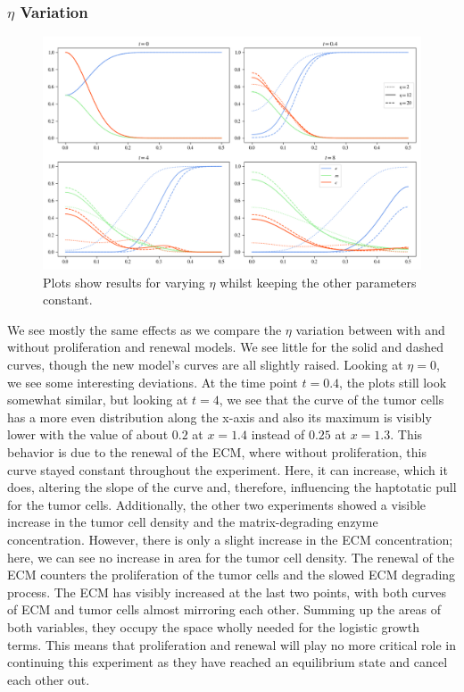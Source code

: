 \subsubsection*{$\eta$ Variation}
\begin{figure}[h]
    \centering
    \includegraphics[width=\textwidth]{resources/images/prolif_eta_variation.png}
    \caption{Plots show results for varying $\eta$ whilst keeping the other parameters constant.}
    \label{fig:prolif_eta_variation}
\end{figure}

We see mostly the same effects as we compare the $\eta$ variation between with and without proliferation and renewal models. We see little for the solid and dashed curves, though the new model's curves are all slightly raised. Looking at $\eta=0$, we see some interesting deviations. At the time point $t=0.4$, the plots still look somewhat similar, but looking at $t=4$, we see that the curve of the tumor cells has a more even distribution along the x-axis and also its maximum is visibly lower with the value of about $0.2$ at $x=1.4$ instead of $0.25$ at $x=1.3$. This behavior is due to the renewal of the ECM, where without proliferation, this curve stayed constant throughout the experiment. Here, it can increase, which it does, altering the slope of the curve and, therefore, influencing the haptotatic pull for the tumor cells.
Additionally, the other two experiments showed a visible increase in the tumor cell density and the matrix-degrading enzyme concentration. However, there is only a slight increase in the ECM concentration; here, we can see no increase in area for the tumor cell density. The renewal of the ECM counters the proliferation of the tumor cells and the slowed ECM degrading process. The ECM has visibly increased at the last two points, with both curves of ECM and tumor cells almost mirroring each other. Summing up the areas of both variables, they occupy the space wholly needed for the logistic growth terms. This means that proliferation and renewal will play no more critical role in continuing this experiment as they have reached an equilibrium state and cancel each other out. 


